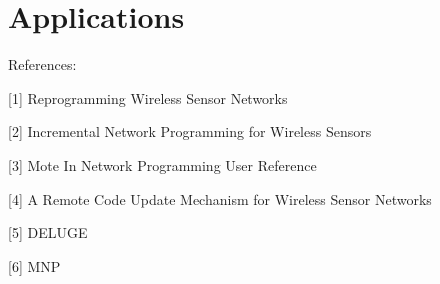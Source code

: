 \documentclass[twocolumn]{article}
\begin{document}
\section{Applications}




References:

[1] Reprogramming Wireless Sensor Networks

[2] Incremental Network Programming for Wireless Sensors

[3] Mote In Network Programming User Reference

[4] A Remote Code Update Mechanism for Wireless Sensor Networks

[5] DELUGE

[6] MNP
\end{document}
